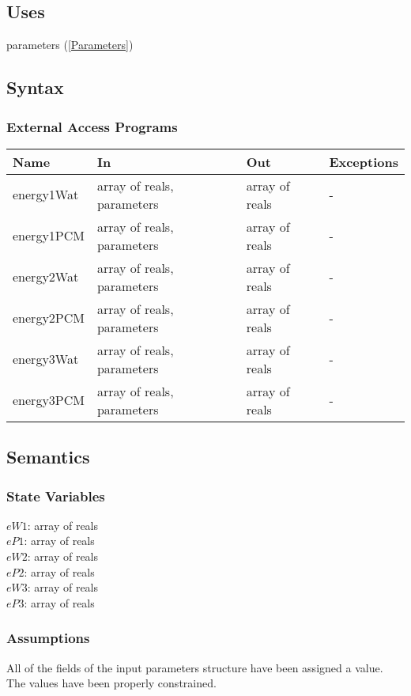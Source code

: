 \documentclass[12pt]{article}
\begin{document}
\subsection{Uses}
parameters (\ref{Parameters})
\subsection{Syntax}
\subsubsection{External Access Programs}
\begin{center}
\begin{tabular}{p{3cm} p{6cm} p{3cm} p{2cm}}
\hline
\textbf{Name} & \textbf{In} & \textbf{Out} & \textbf{Exceptions} \\
\hline
energy1Wat & array of reals, parameters & array of reals & - \\
\hline
energy1PCM & array of reals, parameters & array of reals & - \\
\hline
energy2Wat & array of reals, parameters & array of reals & - \\
\hline
energy2PCM & array of reals, parameters & array of reals & - \\
\hline
energy3Wat & array of reals, parameters & array of reals & - \\
\hline
energy3PCM & array of reals, parameters & array of reals & - \\
\hline
\end{tabular}
\end{center}
\subsection{Semantics}
\subsubsection{State Variables}
$eW1$: array of reals \\
$eP1$: array of reals \\
$eW2$: array of reals \\
$eP2$: array of reals \\
$eW3$: array of reals \\
$eP3$: array of reals 
\subsubsection{Assumptions}
All of the fields of the input parameters structure have been assigned a value. The values have been properly constrained.
\end{document}
